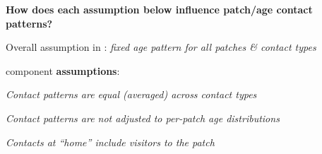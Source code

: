 \textbf{How does each assumption below influence patch/age contact patterns?}%
\bigskip\par
Overall assumption in \cite{Arenas2020}:
\textit{fixed age pattern for all patches \& contact types}\par
{} component \textbf{assumptions}:\par
\begin{assumptions}
  \item \textit{Contact patterns are equal (averaged) across contact types}
  \item \textit{Contact patterns are not adjusted to per-patch age distributions}
  \item \textit{Contacts at ``home'' include visitors to the patch}
\end{assumptions}
